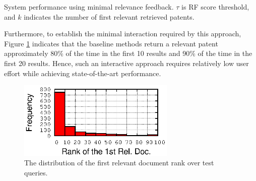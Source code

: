 \begin{table}[t!]
  \begin{center}
   \caption{System performance using minimal relevance feedback. $\tau$ is RF score threshold, and $k$ indicates the number of first relevant retrieved patents.}\vspace{3mm}
     
  \label{tab:firstrel}
  \end{center}  
\end{table}

Furthermore, to establish the minimal interaction required by this
approach, Figure \ref{fig:FirstTPRankHisto} indicates that the
baseline methods return a relevant patent approximately 80\% of the
time in the first 10 results and 90\% of the time in the first 20
results.  Hence, such an interactive approach requires relatively low
user effort while achieving state-of-the-art performance.


\begin{figure}
\begin{centering}
\includegraphics[width=7.5cm]{imgs/1stRank}
\par\end{centering}

\protect\caption{The distribution of the first relevant document rank over test queries.}
\label{fig:FirstTPRankHisto}
\end{figure}


